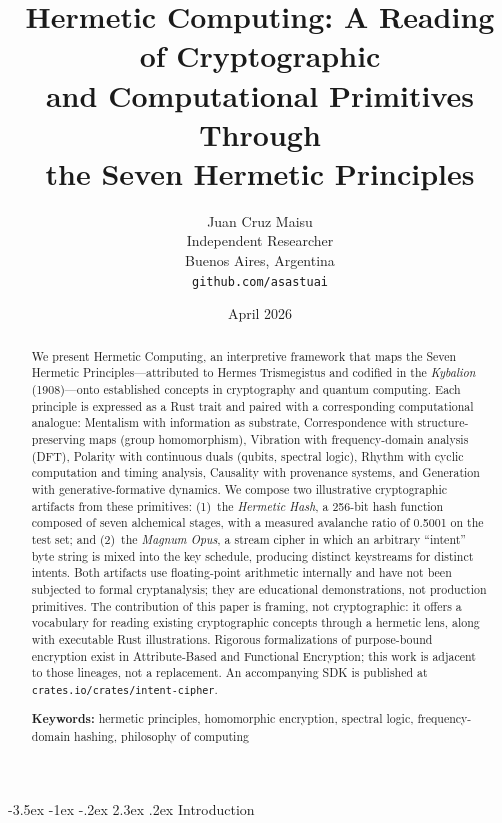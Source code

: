 \documentclass[12pt,a4paper]{article}
\title{Hermetic Computing: A Reading of Cryptographic\\and Computational Primitives Through\\the Seven Hermetic Principles}
\author{
  Juan Cruz Maisu\\
  Independent Researcher\\
  Buenos Aires, Argentina\\
  \texttt{github.com/asastuai}
}
\date{April 2026}
\makeatletter
\renewcommand\section{\@startsection{section}{1}{\z@}%
  {-3.5ex \@plus -1ex \@minus -.2ex}%
  {2.3ex \@plus.2ex}%
  {\needspace{10\baselineskip}\normalfont\Large\bfseries\sloppy\hyphenpenalty=10000\exhyphenpenalty=10000\hbadness=10000}}
\makeatother
\begin{document}
\maketitle

\begin{abstract}
We present Hermetic Computing, an interpretive framework that maps the Seven Hermetic Principles---attributed to Hermes Trismegistus and codified in the \textit{Kybalion} (1908)---onto established concepts in cryptography and quantum computing. Each principle is expressed as a Rust trait and paired with a corresponding computational analogue: Mentalism with information as substrate, Correspondence with structure-preserving maps (group homomorphism), Vibration with frequency-domain analysis (DFT), Polarity with continuous duals (qubits, spectral logic), Rhythm with cyclic computation and timing analysis, Causality with provenance systems, and Generation with generative-formative dynamics. We compose two illustrative cryptographic artifacts from these primitives: (1)~the \textit{Hermetic Hash}, a 256-bit hash function composed of seven alchemical stages, with a measured avalanche ratio of 0.5001 on the test set; and (2)~the \textit{Magnum Opus}, a stream cipher in which an arbitrary ``intent'' byte string is mixed into the key schedule, producing distinct keystreams for distinct intents. Both artifacts use floating-point arithmetic internally and have not been subjected to formal cryptanalysis; they are educational demonstrations, not production primitives. The contribution of this paper is framing, not cryptographic: it offers a vocabulary for reading existing cryptographic concepts through a hermetic lens, along with executable Rust illustrations. Rigorous formalizations of purpose-bound encryption exist in Attribute-Based and Functional Encryption; this work is adjacent to those lineages, not a replacement. An accompanying SDK is published at \texttt{crates.io/crates/intent-cipher}.

\medskip
\noindent\textbf{Keywords:} hermetic principles, homomorphic encryption, spectral logic, frequency-domain hashing, philosophy of computing
\end{abstract}

\clearpage

\section{Introduction}
\end{document}
